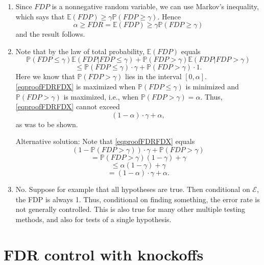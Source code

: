 \documentclass[11pt]{article}
\theoremstyle{plain}
\theoremstyle{definition}
\newcommand{\E}{\mathcal{E}}
\newcommand{\pr}{\mathbb{P}}
\begin{document}
\begin{sols}
\begin{enumerate}
\item Since $FDP$ is a nonnegative random variable, we can use Markov's inequality, which says that $\mathbb{E}(FDP)\geq \gamma \pr(FDP\geq \gamma)$. Hence $$\alpha \geq FDR=\mathbb{E}(FDP)\geq \gamma\pr(FDP\geq \gamma) $$ and the result follows.

\item Note that by the law of total probability,
$\mathbb{E}(FDP)$ equals
$$\pr(FDP\leq \gamma)\mathbb{E}(FDP|FDP\leq \gamma) + \pr(FDP> \gamma)\mathbb{E}(FDP|FDP>\gamma) $$
\begin{equation} \label{eqproofFDRFDX}
\leq \pr(FDP\leq \gamma) \cdot \gamma  + \pr(FDP> \gamma) \cdot 1.
\end{equation}
Here we know that $\pr(FDP> \gamma)$ lies in the interval $[0,\alpha]$.
\eqref{eqproofFDRFDX} is maximized when $\pr(FDP\leq \gamma)$ is minimized and $\pr(FDP> \gamma)$ is maximized, i.e., when $\pr(FDP> \gamma)=\alpha$.
Thus, \eqref{eqproofFDRFDX} cannot exceed
$$ (1-\alpha)\cdot \gamma  + \alpha,$$
as was to be shown.

Alternative solution: Note that \eqref{eqproofFDRFDX} equals 
$$ (1-\pr(FDP> \gamma)) \cdot \gamma  + \pr(FDP> \gamma)$$
$$=\pr(FDP> \gamma)(1-\gamma)+\gamma $$
$$\leq \alpha (1-\gamma)+\gamma $$
$$= (1-\alpha)\cdot \gamma  + \alpha.$$

\item
No. Suppose for example that all hypotheses are true.  Then conditional on $\E$, the FDP is always 1. 
Thus, conditional on finding something, the error rate is not generally controlled. This is also true for many other  multiple testing methods, and also for tests of a single hypothesis.
\end{enumerate}

\end{sols}















\newpage

\section{FDR control with knockoffs} \label{secknockoffs}
\end{document}
